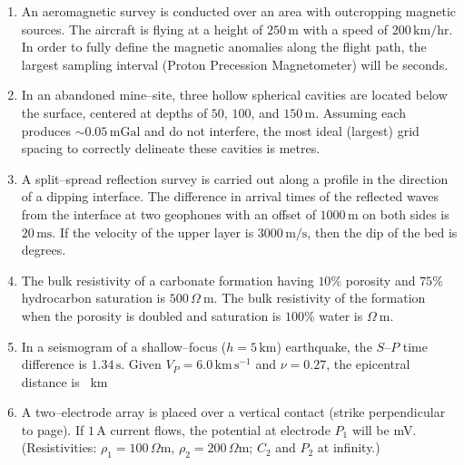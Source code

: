 \documentclass[journal,12pt,onecolumn]{IEEEtran}
\theoremstyle{remark}
\begin{document}
\begin{enumerate}
\item An aeromagnetic survey is conducted over an area with outcropping magnetic sources. The 
aircraft is flying at a height of $250\,\mathrm{m}$ with a speed of $200\,\mathrm{km/hr}$. In order to fully 
define the magnetic anomalies along the flight path, the largest sampling interval (Proton 
Precession Magnetometer) will be \underline{\hspace{10mm}} seconds.
\vspace{0.5cm}

\item In an abandoned mine--site, three hollow spherical cavities are located below the surface, centered at depths of $50$, $100$, and $150\,\mathrm{m}$. Assuming each produces $\sim 0.05\,\mathrm{mGal}$ and do not interfere, the most ideal (largest) grid spacing to correctly delineate these cavities is \underline{\hspace{10mm}} metres.
\vspace{0.5cm}

\item A split--spread reflection survey is carried out along a profile in the direction of a dipping  interface. The difference in arrival times of the reflected waves from the interface at two  geophones with an offset of $1000\,\mathrm{m}$ on both sides is $20\,\mathrm{ms}$. If the velocity of the upper 
layer is $3000\,\mathrm{m/s}$, then the dip of the bed is \underline{\hspace{10mm}} degrees.
\vspace{0.5cm}

\item The bulk resistivity of a carbonate formation having $10\%$ porosity and $75\%$ hydrocarbon 
saturation is $500\,\Omega\ \mathrm{m}$. The bulk resistivity of the formation when the porosity is doubled 
and saturation is $100\%$ water is \underline{\hspace{10mm}} $\Omega\ \mathrm{m}$.
\vspace{0.5cm}

\item In a seismogram of a shallow--focus ($h = 5\,\mathrm{km}$) earthquake, the 
$S$--$P$ time difference is $1.34\,\mathrm{s}$. Given $V_{P} = 6.0\,\mathrm{km\,s^{-1}}$ 
and $\nu = 0.27$, the epicentral distance is \underline{\hspace{10mm}}~km
\vspace{0.5cm}

\item A two--electrode array is placed over a vertical contact (strike perpendicular to page). If $1\,\mathrm{A}$ 
current flows, the potential at electrode $P_1$ will be \underline{\hspace{10mm}} mV.  
(Resistivities: $\rho_1=100\,\Omega\mathrm{m}$, $\rho_2=200\,\Omega\mathrm{m}$; $C_2$ and $P_2$ at infinity.)


\end{enumerate}
\end{document}
